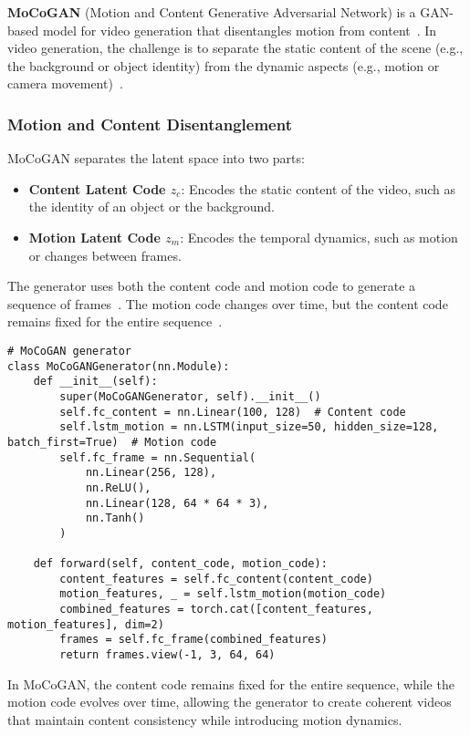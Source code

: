 \textbf{MoCoGAN} (Motion and Content Generative Adversarial Network) is a GAN-based model for video generation that disentangles motion from content~\cite{tulyakov2017mocogan}. In video generation, the challenge is to separate the static content of the scene (e.g., the background or object identity) from the dynamic aspects (e.g., motion or camera movement)~\cite{li2024survey}.

\subsubsection{Motion and Content Disentanglement}

MoCoGAN separates the latent space into two parts:
\begin{itemize}
    \item \textbf{Content Latent Code \( z_c \)}: Encodes the static content of the video, such as the identity of an object or the background.
    \item \textbf{Motion Latent Code \( z_m \)}: Encodes the temporal dynamics, such as motion or changes between frames.
\end{itemize}

The generator uses both the content code and motion code to generate a sequence of frames~\cite{tulyakov2017mocogan}. The motion code changes over time, but the content code remains fixed for the entire sequence~\cite{li2024survey}.

\begin{lstlisting}[style=python]
# MoCoGAN generator
class MoCoGANGenerator(nn.Module):
    def __init__(self):
        super(MoCoGANGenerator, self).__init__()
        self.fc_content = nn.Linear(100, 128)  # Content code
        self.lstm_motion = nn.LSTM(input_size=50, hidden_size=128, batch_first=True)  # Motion code
        self.fc_frame = nn.Sequential(
            nn.Linear(256, 128),
            nn.ReLU(),
            nn.Linear(128, 64 * 64 * 3),
            nn.Tanh()
        )

    def forward(self, content_code, motion_code):
        content_features = self.fc_content(content_code)
        motion_features, _ = self.lstm_motion(motion_code)
        combined_features = torch.cat([content_features, motion_features], dim=2)
        frames = self.fc_frame(combined_features)
        return frames.view(-1, 3, 64, 64)
\end{lstlisting}

In MoCoGAN, the content code remains fixed for the entire sequence, while the motion code evolves over time, allowing the generator to create coherent videos that maintain content consistency while introducing motion dynamics.

